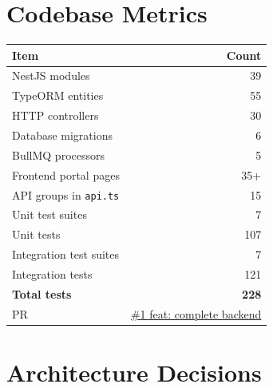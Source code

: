 \documentclass[11pt, a4paper]{article}
\newcommand{\code}[1]{\texttt{\small #1}}
\begin{document}
\section{Codebase Metrics}

\begin{tabular}{@{}lr@{}}
  \toprule
  Item & Count \\
  \midrule
  NestJS modules & 39 \\
  TypeORM entities & 55 \\
  HTTP controllers & 30 \\
  Database migrations & 6 \\
  BullMQ processors & 5 \\
  Frontend portal pages & 35+ \\
  API groups in \code{api.ts} & 15 \\
  \midrule
  Unit test suites & 7 \\
  Unit tests & 107 \\
  Integration test suites & 7 \\
  Integration tests & 121 \\
  \textbf{Total tests} & \textbf{228} \\
  \midrule
  PR & \href{https://github.com/umangGG1/school\_management\_system/pull/1}{\#1 feat: complete backend} \\
  \bottomrule
\end{tabular}

\section{Architecture Decisions}
\end{document}
